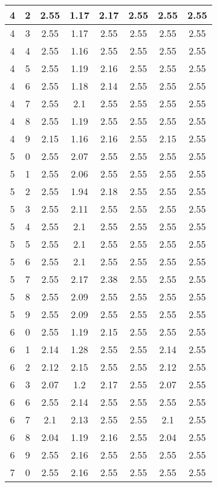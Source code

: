 \begin{longtable}{|c|c||c||c|c|c||c|c|}
	4 & 2 & 2.55 & 1.17 & 2.17 & 2.55 & 2.55 & 2.55 \\ \hline
	4 & 3 & 2.55 & 1.17 & 2.55 & 2.55 & 2.55 & 2.55 \\ \hline
	4 & 4 & 2.55 & 1.16 & 2.55 & 2.55 & 2.55 & 2.55 \\ \hline
	4 & 5 & 2.55 & 1.19 & 2.16 & 2.55 & 2.55 & 2.55 \\ \hline
	4 & 6 & 2.55 & 1.18 & 2.14 & 2.55 & 2.55 & 2.55 \\ \hline
	4 & 7 & 2.55 & 2.1 & 2.55 & 2.55 & 2.55 & 2.55 \\ \hline
	4 & 8 & 2.55 & 1.19 & 2.55 & 2.55 & 2.55 & 2.55 \\ \hline
	4 & 9 & 2.15 & 1.16 & 2.16 & 2.55 & 2.15 & 2.55 \\ \hline
	5 & 0 & 2.55 & 2.07 & 2.55 & 2.55 & 2.55 & 2.55 \\ \hline
	5 & 1 & 2.55 & 2.06 & 2.55 & 2.55 & 2.55 & 2.55 \\ \hline
	5 & 2 & 2.55 & 1.94 & 2.18 & 2.55 & 2.55 & 2.55 \\ \hline
	5 & 3 & 2.55 & 2.11 & 2.55 & 2.55 & 2.55 & 2.55 \\ \hline
	5 & 4 & 2.55 & 2.1 & 2.55 & 2.55 & 2.55 & 2.55 \\ \hline
	5 & 5 & 2.55 & 2.1 & 2.55 & 2.55 & 2.55 & 2.55 \\ \hline
	5 & 6 & 2.55 & 2.1 & 2.55 & 2.55 & 2.55 & 2.55 \\ \hline
	5 & 7 & 2.55 & 2.17 & 2.38 & 2.55 & 2.55 & 2.55 \\ \hline
	5 & 8 & 2.55 & 2.09 & 2.55 & 2.55 & 2.55 & 2.55 \\ \hline
	5 & 9 & 2.55 & 2.09 & 2.55 & 2.55 & 2.55 & 2.55 \\ \hline
	6 & 0 & 2.55 & 1.19 & 2.15 & 2.55 & 2.55 & 2.55 \\ \hline
	6 & 1 & 2.14 & 1.28 & 2.55 & 2.55 & 2.14 & 2.55 \\ \hline
	6 & 2 & 2.12 & 2.15 & 2.55 & 2.55 & 2.12 & 2.55 \\ \hline
	6 & 3 & 2.07 & 1.2 & 2.17 & 2.55 & 2.07 & 2.55 \\ \hline
	6 & 6 & 2.55 & 2.14 & 2.55 & 2.55 & 2.55 & 2.55 \\ \hline
	6 & 7 & 2.1 & 2.13 & 2.55 & 2.55 & 2.1 & 2.55 \\ \hline
	6 & 8 & 2.04 & 1.19 & 2.16 & 2.55 & 2.04 & 2.55 \\ \hline
	6 & 9 & 2.55 & 2.16 & 2.55 & 2.55 & 2.55 & 2.55 \\ \hline
	7 & 0 & 2.55 & 2.16 & 2.55 & 2.55 & 2.55 & 2.55 \\ \hline

\end{longtable}
